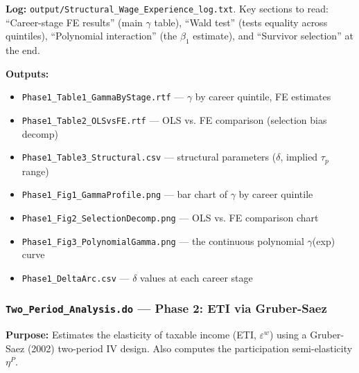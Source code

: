 \documentclass[11pt, letterpaper]{article}
\newcommand{\dofile}[1]{\texttt{#1}}
\newcommand{\logfile}[1]{\texttt{#1}}
\newcommand{\outputfile}[1]{\texttt{#1}}
\begin{document}
\textbf{Log:} \logfile{output/Structural\_Wage\_Experience\_log.txt}. Key sections to read: ``Career-stage FE results'' (main $\gamma$ table), ``Wald test'' (tests equality across quintiles), ``Polynomial interaction'' (the $\beta_1$ estimate), and ``Survivor selection'' at the end.

\textbf{Outputs:}
\begin{itemize}
    \item \outputfile{Phase1\_Table1\_GammaByStage.rtf} --- $\gamma$ by career quintile, FE estimates
    \item \outputfile{Phase1\_Table2\_OLSvsFE.rtf} --- OLS vs. FE comparison (selection bias decomp)
    \item \outputfile{Phase1\_Table3\_Structural.csv} --- structural parameters ($\delta$, implied $\tau_p$ range)
    \item \outputfile{Phase1\_Fig1\_GammaProfile.png} --- bar chart of $\gamma$ by career quintile
    \item \outputfile{Phase1\_Fig2\_SelectionDecomp.png} --- OLS vs. FE comparison chart
    \item \outputfile{Phase1\_Fig3\_PolynomialGamma.png} --- the continuous polynomial $\gamma$(exp) curve
    \item \outputfile{Phase1\_DeltaArc.csv} --- $\delta$ values at each career stage
\end{itemize}

\vspace{6pt}
\subsubsection{\dofile{Two\_Period\_Analysis.do} \textnormal{--- Phase 2: ETI via Gruber-Saez}}

\textbf{Purpose:} Estimates the elasticity of taxable income (ETI, $\varepsilon^w$) using a Gruber-Saez (2002) two-period IV design. Also computes the participation semi-elasticity $\eta^P$.
\end{document}
